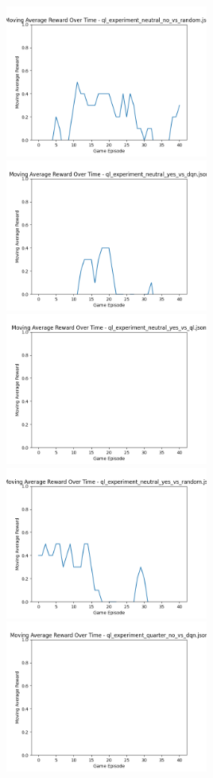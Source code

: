 \includegraphics[width=0.5\textwidth]{images/moving_average_reward_ql_experiment_neutral_no_vs_random.png} 
\includegraphics[width=0.5\textwidth]{images/moving_average_reward_ql_experiment_neutral_yes_vs_dqn.png} 
\includegraphics[width=0.5\textwidth]{images/moving_average_reward_ql_experiment_neutral_yes_vs_ql.png} 
\includegraphics[width=0.5\textwidth]{images/moving_average_reward_ql_experiment_neutral_yes_vs_random.png} 
\includegraphics[width=0.5\textwidth]{images/moving_average_reward_ql_experiment_quarter_no_vs_dqn.png} 
